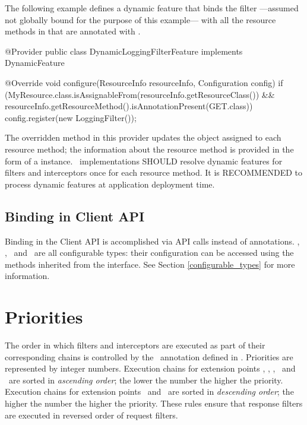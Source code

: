 The following example defines a dynamic feature that binds the filter  ---assumed not globally bound for the purpose of this example--- with all the resource methods in  that are annotated with .

\begin{listing}{1}
@Provider
public class DynamicLoggingFilterFeature implements DynamicFeature {

  @Override
  void configure(ResourceInfo resourceInfo, Configuration config) {
    if (MyResource.class.isAssignableFrom(resourceInfo.getResourceClass())
      && resourceInfo.getResourceMethod().isAnnotationPresent(GET.class)) {
      config.register(new LoggingFilter());
    }
  }
}

\end{listing}

The overridden method in this provider updates the  object assigned to each resource method; the information about the resource method is provided in the form of a  instance.
\jaxrs\ implementations SHOULD resolve dynamic features for filters and interceptors once for each resource method. It is RECOMMENDED to process dynamic features at application deployment time.

\subsection{Binding in Client API}
\label{binding_in_client_api}

Binding in the Client API is accomplished via API calls instead of annotations. \Client, \Invocation, \InvocationBuilder\ and \WebTarget\ are all configurable types: their configuration can be accessed using the methods inherited from the  interface. See Section \ref{configurable_types} for more information.

\section{Priorities}
\label{priorities}

The order in which filters and interceptors are executed as part of their corresponding chains is controlled by the \Priority\ annotation defined in \cite{jsr250}.
Priorities are represented by integer numbers. Execution chains for extension points \ContainerRequest, \PreMatchContainerRequest, \ClientRequest, \ReadFrom\ and \WriteTo\ are sorted in \emph{ascending order}; the lower the number the higher the priority. Execution chains for extension points \ContainerResponse\ and \ClientResponse\ are sorted in \emph{descending order}; the higher the number the higher the priority. These rules ensure that response filters are executed in reversed order of request filters.

